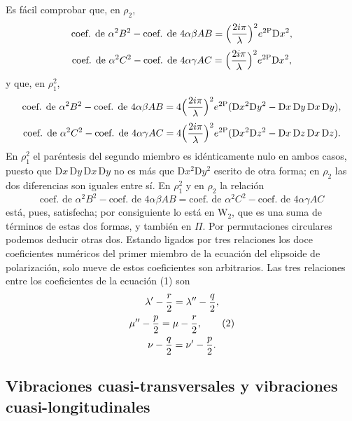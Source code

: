 Es fácil comprobar que, en $\rho_2$,
\[
\text{coef. de }\alpha^2B^2-\text{coef. de }4\alpha\beta AB=\Bigl(\frac{2i\pi}{\lambda}\Bigr)^2e^{2\mathrm P}\mathrm{D}x^2,
\]
\[
\text{coef. de }\alpha^2C^2-\text{coef. de }4\alpha\gamma AC=\Bigl(\frac{2i\pi}{\lambda}\Bigr)^2e^{2\mathrm P}\mathrm{D}x^2,
\]
y que, en $\rho_1^2$,
\[
\text{coef. de }\alpha^2B^2-\text{coef. de }4\alpha\beta AB
=4\Bigl(\frac{2i\pi}{\lambda}\Bigr)^2e^{2\mathrm P}(\mathrm{D}x^2\mathrm{D}y^2-\mathrm{D}x\,\mathrm{D}y\,\mathrm{D}x\,\mathrm{D}y),
\]
\[
\text{coef. de }\alpha^2C^2-\text{coef. de }4\alpha\gamma AC
=4\Bigl(\frac{2i\pi}{\lambda}\Bigr)^2e^{2\mathrm P}(\mathrm{D}x^2\mathrm{D}z^2-\mathrm{D}x\,\mathrm{D}z\,\mathrm{D}x\,\mathrm{D}z).
\]
En $\rho_1^2$ el paréntesis del segundo miembro es idénticamente nulo en
ambos casos, puesto que $\mathrm{D}x\,\mathrm{D}y\,\mathrm{D}x\,\mathrm{D}y$
no es más que $\mathrm{D}x^2\mathrm{D}y^2$ escrito de otra forma; en
$\rho_2$ las dos diferencias son iguales entre sí. En $\rho_1^2$ y en
$\rho_2$ la relación
\[
\text{coef. de }\alpha^2B^2-\text{coef. de }4\alpha\beta AB=\text{coef. de }\alpha^2C^2-\text{coef. de }4\alpha\gamma AC
\]
está, pues, satisfecha; por consiguiente lo está en $\mathrm{W}_2$, que es una suma
de términos de estas dos formas, y también en $\Pi$. Por permutaciones
circulares podemos deducir otras dos. Estando ligados por tres relaciones
los doce coeficientes numéricos del primer miembro de la ecuación del
elipsoide de polarización, solo nueve de estos coeficientes son
arbitrarios. Las tres relaciones entre los coeficientes de la ecuación (1)
son
\begin{gather}
\lambda'-\frac{r}{2}=\lambda''-\frac{q}{2},\notag\\
\mu''-\frac{p}{2}=\mu-\frac{r}{2},
\tag{2}\\
\nu-\frac{q}{2}=\nu'-\frac{p}{2}.\notag
\end{gather}

\subsection[Vibraciones cuasi-transversales y vibraciones\texorpdfstring{\protect\newline}{}{} cuasi-longitudinales]{Vibraciones cuasi-transversales y vibraciones\\ cuasi-longitudinales}

